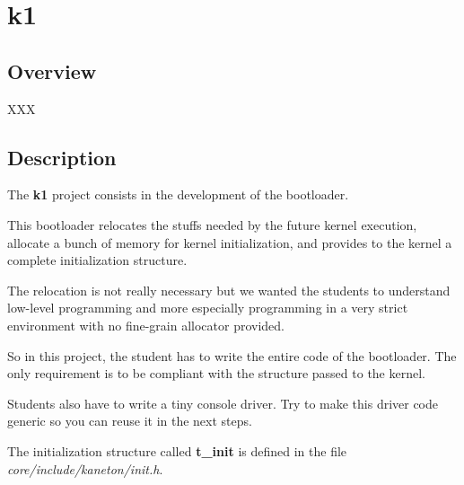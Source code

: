 
%
%

\section{k1}

%
%

\subsection{Overview}

XXX

%
%

\subsection{Description}

The \textbf{k1} project consists in the development of the bootloader.

This  bootloader relocates  the  stuffs needed  by  the future  kernel
execution, allocate  a bunch of memory for  kernel initialization, and
provides to the kernel a complete initialization structure.

The relocation is not really necessary but we wanted the students
to understand low-level programming and more especially programming
in a very strict environment with no fine-grain allocator provided.

So in this project, the student has to write the entire code of the
bootloader. The only requirement is to be compliant with the structure
passed to the kernel.

Students also  have to write a  tiny console driver. Try  to make this
driver code generic so you can reuse it in the next steps.

The initialization structure called \textbf{t\_init} is defined in the
file \textit{core/include/kaneton/init.h}.

